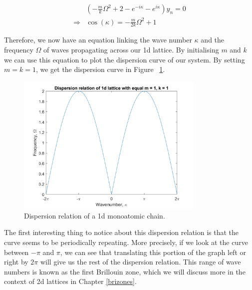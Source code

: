 \begin{align}
  &\left(-\frac{m}{k}\Omega^{2}+2-e^{-i\kappa}-e^{i\kappa}\right)y_{n}=0 \\
  \Rightarrow &\cos\left(\kappa\right)=-\frac{m}{2k}\Omega^{2}+1
\end{align}

Therefore, we now have an equation linking the wave number $\kappa$ and the
frequency $\Omega$ of waves propagating across our 1d lattice. By initialising
$m$ and $k$ we can use this equation to plot the dispersion curve of our
system. By setting $m=k=1$, we get the dispersion curve in Figure
~\ref{fig:dc1}.

\begin{figure}[!h]
\centering
\includegraphics[width=0.8\textwidth]{imgs/1ddispersion.png}
\caption{\label{fig:dc1}Dispersion relation of a 1d monoatomic
         chain.}
\end{figure}

The first interesting thing to notice about this dispersion relation is that
the curve seems to be periodically repeating. More precisely, if we look at the
curve between $-\pi$ and $\pi$, we can see that translating this portion of the
graph left or right by $2\pi$ will give us the rest of the dispersion relation.
This range of wave numbers is known as the first Brillouin zone, which we will
discuss more in the context of 2d lattices in Chapter \ref{brizones}.

